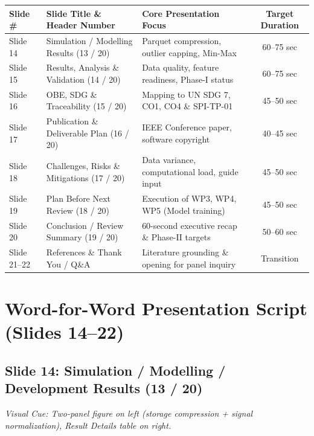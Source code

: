 \documentclass[11pt,a4paper]{article}
\begin{document}
\begin{table}[h!]
\centering
\small
\begin{tabularx}{\textwidth}{lXlc}
\toprule
\textbf{Slide \#} & \textbf{Slide Title \& Header Number} & \textbf{Core Presentation Focus} & \textbf{Target Duration} \\
\midrule
Slide 14 & Simulation / Modelling Results (13 / 20) & Parquet compression, outlier capping, Min-Max & 60--75 sec \\
Slide 15 & Results, Analysis \& Validation (14 / 20) & Data quality, feature readiness, Phase-I status & 60--75 sec \\
Slide 16 & OBE, SDG \& Traceability (15 / 20) & Mapping to UN SDG 7, CO1, CO4 \& SPI-TP-01 & 45--50 sec \\
Slide 17 & Publication \& Deliverable Plan (16 / 20) & IEEE Conference paper, software copyright & 40--45 sec \\
Slide 18 & Challenges, Risks \& Mitigations (17 / 20) & Data variance, computational load, guide input & 45--50 sec \\
Slide 19 & Plan Before Next Review (18 / 20) & Execution of WP3, WP4, WP5 (Model training) & 45--50 sec \\
Slide 20 & Conclusion / Review Summary (19 / 20) & 60-second executive recap \& Phase-II targets & 50--60 sec \\
Slide 21--22 & References \& Thank You / Q\&A & Literature grounding \& opening for panel inquiry & Transition \\
\bottomrule
\end{tabularx}
\end{table}

\section{Word-for-Word Presentation Script (Slides 14--22)}

\subsection{Slide 14: Simulation / Modelling / Development Results (13 / 20)}
\textit{Visual Cue: Two-panel figure on left (storage compression + signal normalization), Result Details table on right.}
\end{document}
